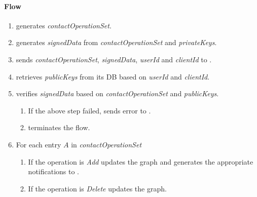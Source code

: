 \documentclass[a4paper,10pt]{article}
\newcommand{\signedData}{\emph{signedData}}
\newcommand{\privateKeys}{\emph{privateKeys}}
\newcommand{\publicKeys}{\emph{publicKeys}}
\newcommand{\userId}{\emph{userId}}
\newcommand{\clientId}{\emph{clientId}}
\newcommand{\contactOperationSet}{\emph{contactOperationSet}}
\begin{document}
\paragraph{Flow}

\begin{enumerate}
 \item \Client{} generates \contactOperationSet{}.
 \item \Client{} generates \signedData{} from \contactOperationSet{} and \privateKeys{}.
 \item \Client{} sends \contactOperationSet{}, \signedData{}, \userId{} and \clientId{} to \Server{}.
 \item \Server{} retrieves \publicKeys{} from its DB based on \userId{} and 
\clientId{}.
 \item \Server{} verifies \signedData{} based on \contactOperationSet{} and \publicKeys{}.
 \begin{enumerate}
  \item If the above step failed, \Server{} sends error to \Client{}.
  \item \Client{} terminates the flow.
 \end{enumerate}
 \item For each entry $A$ in \contactOperationSet{}
 \begin{enumerate}
  \item If the operation is {\em Add} \Server{} updates the graph and generates the appropriate notifications to \Client{}.
  \item If the operation is {\em Delete} \Server{} updates the graph.
 \end{enumerate}
\end{enumerate}



\end{document}
